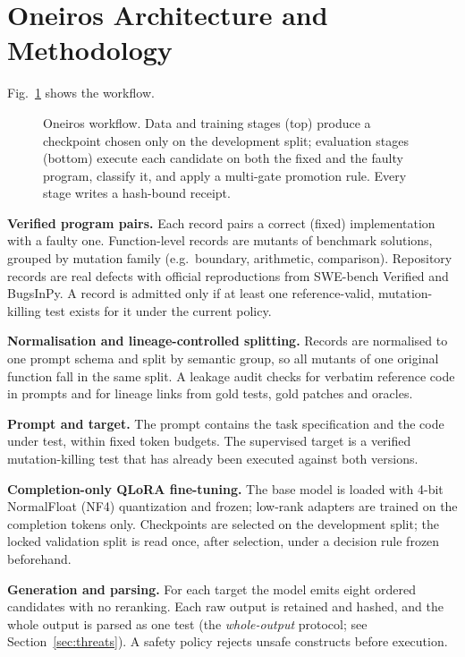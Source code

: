 \documentclass[10pt,conference,letterpaper]{IEEEtran}
\begin{document}
\section{Oneiros Architecture and Methodology}

Fig.~\ref{fig:workflow} shows the workflow.

\begin{figure}[t]
\centering

\caption{Oneiros workflow. Data and training stages (top) produce a checkpoint chosen
only on the development split; evaluation stages (bottom) execute each candidate on
both the fixed and the faulty program, classify it, and apply a multi-gate promotion
rule. Every stage writes a hash-bound receipt.}
\label{fig:workflow}
\end{figure}

\textbf{Verified program pairs.} Each record pairs a correct (fixed) implementation
with a faulty one. Function-level records are mutants of benchmark solutions, grouped
by mutation family (e.g.\ boundary, arithmetic, comparison). Repository records are
real defects with official reproductions from SWE-bench Verified and BugsInPy. A record
is admitted only if at least one reference-valid, mutation-killing test exists for it
under the current policy.

\textbf{Normalisation and lineage-controlled splitting.} Records are normalised to one
prompt schema and split by semantic group, so all mutants of one original function
fall in the same split. A leakage audit checks for verbatim reference code in prompts
and for lineage links from gold tests, gold patches and oracles.

\textbf{Prompt and target.} The prompt contains the task specification and the code
under test, within fixed token budgets. The supervised target is a verified
mutation-killing test that has already been executed against both versions.

\textbf{Completion-only QLoRA fine-tuning.} The base model is loaded with 4-bit
NormalFloat (NF4) quantization and frozen; low-rank adapters are trained on the
completion tokens only. Checkpoints are selected on the development split; the locked
validation split is read once, after selection, under a decision rule frozen
beforehand.

\textbf{Generation and parsing.} For each target the model emits eight ordered
candidates with no reranking. Each raw output is retained and hashed, and the whole
output is parsed as one test (the \emph{whole-output} protocol; see
Section~\ref{sec:threats}). A safety policy rejects unsafe constructs before execution.
\end{document}
